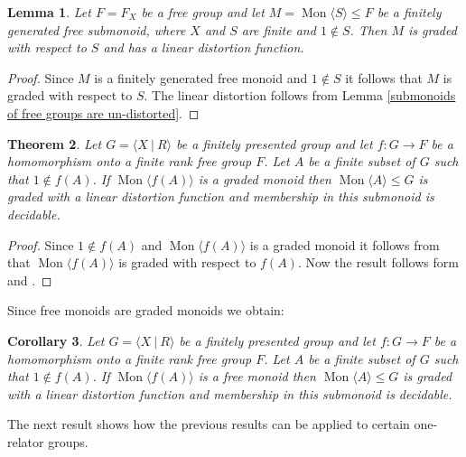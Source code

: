 \documentclass[11pt]{amsart}
\newcommand{\Mgen}[1]{\operatorname{Mon}\bigl\langle #1 \bigr\rangle}
\newcommand{\Gpres}[2]{\bigl\langle #1\:|\:#2 \bigr\rangle}
\theoremstyle{plain}
\newtheorem{theorem}{Theorem}[section]
\newtheorem{lemma}[theorem]{Lemma}
\newtheorem{cor}[theorem]{Corollary}
\theoremstyle{definition}
\begin{document}
\begin{lemma}\label{lemma: free submonoids are graded in free groups with linear distortion}
Let $F = F_X$ be a free group and let $M = \Mgen{S} \leq F$ be a finitely generated free submonoid, where $X$ and $S$ are finite and $1 \not\in S$. Then $M$ is graded with respect to $S$ and has a linear distortion function.
\end{lemma}

\begin{proof}
Since $M$ is a finitely generated free monoid and $1 \not\in S$ it follows that $M$ is graded with respect to $S$. 
The linear distortion follows from Lemma \ref{submonoids of free groups are un-distorted}.
\end{proof}

\begin{theorem}\label{thm:DistortionMapToFreeGroup}
  Let $G = \Gpres{X}{R}$ be a finitely presented group and let $f:G \rightarrow F$ be a homomorphism onto a finite rank free group $F$. Let $A$ be a finite subset of $G$ such that $1 \not\in f(A)$. If $\Mgen{f(A)}$ is a graded monoid then $\Mgen{A} \leq G$ is graded with a linear distortion function and membership in this submonoid is decidable.  
\end{theorem}

\begin{proof}
Since $1 \not\in f(A)$ and $\Mgen{f(A)}$ is a graded monoid it follows from \cite[Proposition 1.6]{margolis2005distortion} that $\Mgen{f(A)}$ is graded with respect to $f(A)$. 
Now the result follows form  and .
\end{proof}


Since free monoids are graded monoids we obtain:  

\begin{cor}\label{cor:DistortionMapToFreeGroup}
  Let $G = \Gpres{X}{R}$ be a finitely presented group and let $f:G \rightarrow F$ be a homomorphism onto a finite rank free group $F$. Let $A$ be a finite subset of $G$ such that $1 \not\in f(A)$. If $\Mgen{f(A)}$ is a free monoid then $\Mgen{A} \leq G$ is graded with a linear distortion function and membership in this submonoid is decidable. 
\end{cor}


The next result shows how the previous results can be applied to certain 
one-relator groups.
\end{document}

